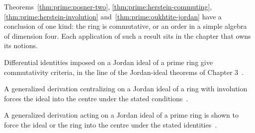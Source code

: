 Theorems~\ref{thm:prime:posner-two}, \ref{thm:prime:herstein-commuting},
\ref{thm:prime:herstein-involution} and~\ref{thm:prime:oukhtite-jordan} have a
conclusion of one kind: the ring is commutative, or an order in a simple
algebra of dimension four. Each application of such a result sits in the
chapter that owns its notions.

Differential identities imposed on a Jordan ideal of a prime ring give
commutativity criteria, in the line of the Jordan-ideal theorems of Chapter
3~\cite{WlSomeCommutativityCriteria2019}.

A generalized derivation centralizing on a Jordan ideal of a ring with
involution forces the ideal into the centre under the stated
conditions~\cite{WlGeneralizedDerivationsCentrali2014}.

A generalized derivation acting on a Jordan ideal of a prime ring is shown to
force the ideal or the ring into the centre under the stated
identities~\cite{WlCommutativityOfPrimeRingsWithG2022}.
